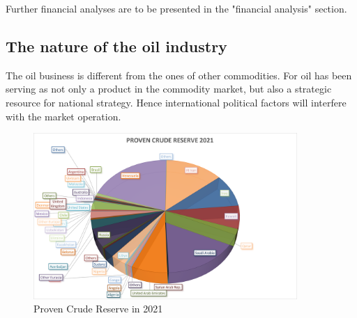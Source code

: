 \documentclass[
	a4paper, %
	12pt,%
]{CSSullivanBusinessReport}
\begin{document}
\begin{fullwidth}
\begin{table}[h]
    \label{dd}
\end{table}
Further financial analyses are to be presented in the "financial analysis" section.
\subsection{The nature of the oil industry}
    The oil business is different from the ones of other commodities. For oil has been serving as not only a product in the commodity market, but also a strategic resource for national strategy. Hence international political factors will interfere with the market operation. \par

    \begin{figure}[H]
        \centering
        \includegraphics[width = 10cm]{Images/Proven Crude Reserve 2021.png}
        \caption{Proven Crude Reserve in 2021}
        \label{crude2021}
    \end{figure}
    

\end{fullwidth}
\end{document}
